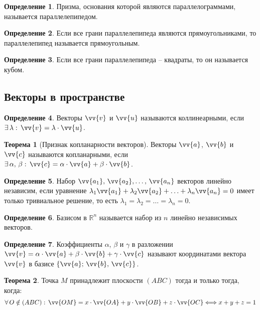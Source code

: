 \documentclass[12pt]{article}
\theoremstyle{definition}
\newtheorem{theorem}{Теорема}[section]
\newtheorem{definition}{Определение}
\newcommand{\R}{\mathbb{R}}
\begin{document}
    \begin{definition}
        Призма, основания которой являются параллелограммами, называется параллелепипедом.
    \end{definition}
    \begin{definition}
        Если все грани параллелепипеда являются прямоугольниками, то параллелепипед называется прямоугольным.
    \end{definition}
    \begin{definition}
        Если все грани параллелепипеда – квадраты, то он называется кубом.
    \end{definition}
    
    
    \subsection{Векторы в пространстве}
    
    \begin{definition}
        Векторы $\vv{v}$ и $\vv{u}$ называются коллинеарными, если $\exists\,\lambda:\,\vv{v}=\lambda\cdot\vv{u}$.
    \end{definition}
    \begin{theorem}[Признак копланарности векторов]
        Векторы $\vv{a}$, $\vv{b}$ и $\vv{c}$ называются копланарными, если $\exists\,\alpha,\,\beta:\,\vv{c}=\alpha\cdot\vv{a}+\beta\cdot\vv{b}$.
    \end{theorem}
    \begin{definition}
        Набор $\vv{a_1},\,\vv{a_2},\ldots,\,\vv{a_n}$ векторов линейно независим, если уравнение $\lambda_1\vv{a_1}+\lambda_2\vv{a_2}+\ldots+\lambda_n\vv{a_n}=0$ имеет только тривиальное решение, то есть $\lambda_1=\lambda_2=\ldots=\lambda_n=0$.
    \end{definition}
    \begin{definition}
        Базисом в $\R^n$ называется набор из $n$ линейно независимых векторов.
    \end{definition}
    \begin{definition}
        Коэффициенты $\alpha$, $\beta$ и $\gamma$ в разложении $\vv{v}=\alpha\cdot\vv{a}+\beta\cdot\vv{b}+\gamma\cdot\vv{c}$ называют координатами вектора $\vv{v}$ в базисе $\{\vv{a};\,\vv{b},\,\vv{c}\}$.
    \end{definition}
    \begin{theorem}
        Точка $M$ принадлежит плоскости $(ABC)$ тогда и только тогда, когда:
        $$\forall\,O\notin(ABC):\,\vv{OM}=x\cdot\vv{OA}+y\cdot\vv{OB}+z\cdot\vv{OC}\Longleftrightarrow x+y+z=1$$
    \end{theorem}
    
\end{document}
